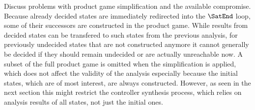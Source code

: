     Discuss problems with product game simplification and the available compromise.
    Because already decided states are immediately redirected into the $\SatEnd$ loop, some of their successors are constructed in the product game.
    While results from decided states can be transfered to such states from the previous analysis, for previously undecided states that are not constructed anymore it cannot generally be decided if they should remain undecided or are actually unreachable now.
    A subset of the full product game is omitted when the simplification is applied, which does not affect the validity of the analysis especially because the initial states, which are of most interest, are always constructed.
    However, as seen in the next section this might restrict the controller synthesis process, which relies on analysis results of all states, not just the initial ones.

\stopsubsection

